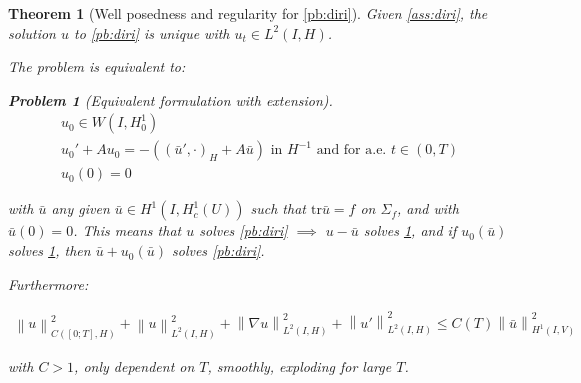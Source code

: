 \documentclass[english,a4paper,10pt,oneside]{scrbook}	%
\theoremstyle{break}
\newtheorem{thm}[equation]{Theorem}
\newtheorem{pb}[equation]{Problem}
\theoremstyle{remark}
\newcommand{\norm}[1]{\left\lVert#1\right\rVert}
\newcommand{\tr}{\text{tr}}
\begin{document}
\begin{thm}[Well posedness and regularity for \cref{pb:diri}]
\label{prop:diri_wp}
Given \cref{ass:diri}, the solution $u$ to \cref{pb:diri} is unique with $u_t \in L^2(I,H)$. 


The problem is equivalent to:

\begin{pb}[Equivalent formulation with extension]
\label{pb:diri_ext}
\begin{align}
u_0 \in W(I,H^1_0) \\
u_0' + A u_0 = -((\bar{u}',\cdot)_H+A \bar{u}) \text{ in }H^{-1} \text{ and for a.e. } t \in (0,T) \\
u_0(0)=0
\end{align}
\end{pb}

with $\bar{u}$ any given $\bar{u}\in H^1(I,H^1_c(U))$ such that $\tr \bar{u} =f$ on $\Sigma_f$, and with $\bar{u}(0)=0$. This means that $u$ solves \cref{pb:diri} $\implies$ $u-\bar{u}$ solves \cref{pb:diri_ext}, and if $u_0(\bar{u})$ solves  \cref{pb:diri_ext}, then $\bar{u}+u_0(\bar{u})$ solves \cref{pb:diri}.

Furthermore: 

\begin{align}
\norm{u}^2_{C([0;T],H)}+\norm{u}_{L^2(I,H)}^2+ \norm{\nabla u}_{L^2(I,H)}^2 + \norm{u'}^2_{L^2(I,H)}\leq C(T)\norm{\bar{u}}_{H^1(I,V)}^2
\end{align}

with $C>1$, only dependent on $T$, smoothly, exploding for large $T$.

\end{thm}
\end{document}
